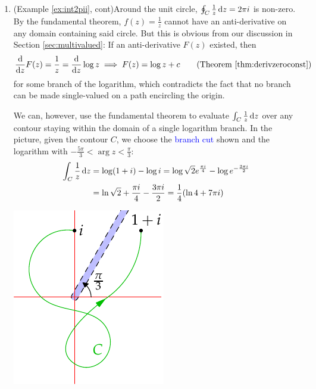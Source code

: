 \begin{examples}{}{}
\begin{enumerate}
	  \item (Example \ref{ex:int2pii}, cont)\lstsp Around the unit circle, $\oint_C\frac 1z\,{\mathrm{d} z}=2\pi i$ is non-zero. By the fundamental theorem, $f(z)=\frac 1z$ cannot have an anti-derivative on any domain containing said circle. But this is obvious from our discussion in Section \ref{sec:multivalued}: If an anti-derivative $F(z)$ existed, then
		\[
			\diff zF(z)=\frac 1z =\diff z\log z \implies F(z)=\log z+c \tag{Theorem \ref{thm:derivzeroconst}}
		\]
		for some branch of the logarithm, which contradicts the fact that no branch can be made single-valued on a path encircling the origin.\par
		\begin{minipage}[t]{0.7\linewidth}\vspace{-10pt}
			We can, however, use the fundamental theorem to evaluate $\int_C\frac 1z\,{\mathrm{d} z}$ over any contour staying within the domain of a single logarithm branch. In the picture, given the contour $C$, we choose the \textcolor{blue}{branch cut} shown and the logarithm with $-\frac{5\pi}3<\arg z<\frac\pi 3$:
			\begin{align*}
				\int_C\frac 1z\,{\mathrm{d} z}&=\log(1+i)-\log i =\log\sqrt 2e^{\frac{\pi i}{4}}-\log e^{-\frac{3\pi i}{2}}\\
				&=\ln\sqrt 2+\frac{\pi i}4-\frac{3\pi i}2=\frac 14(\ln 4+7\pi i)
			\end{align*}
		\end{minipage}
		\hfill
		\begin{minipage}[t]{0.29\linewidth}\vspace{-20pt}
			\flushright\includegraphics{contour-branch}
		\end{minipage}
	\end{enumerate}

\end{examples}


